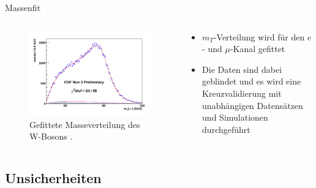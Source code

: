 \documentclass[aspectratio=1610, 9pt]{beamer}
\begin{document}
\begin{frame}{Massenfit}
  \begin{columns}
    \begin{column}{0.4\textwidth}
      \begin{figure}
        \includegraphics[width=\textwidth]{images/m-fit.png}
        \caption{Gefittete Masseverteilung des W-Bosons \cite{unsicherheiten}.}
      \end{figure}
    \end{column}
    \begin{column}{0.4\textwidth}
      \begin{itemize}
        \item $m_T$-Verteilung wird für den $e$- und $\mu$-Kanal gefittet
        \item Die Daten sind dabei geblindet und es wird eine Kreuzvalidierung mit unabhängigen Datensätzen und Simulationen durchgeführt
      \end{itemize}
    \end{column}
  \end{columns}

\end{frame}

\subsection{Unsicherheiten}
\end{document}
